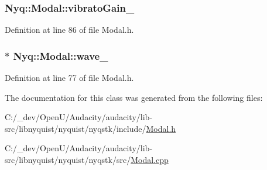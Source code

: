 \subsubsection[{\texorpdfstring{vibrato\+Gain\+\_\+}{vibratoGain_}}]{ Nyq\+::\+Modal\+::vibrato\+Gain\+\_\+\hspace{0.3cm}{\ttfamily [protected]}}\hypertarget{class_nyq_1_1_modal_af45d3067a2cce0a33d90ca5e732b99ab}{}\label{class_nyq_1_1_modal_af45d3067a2cce0a33d90ca5e732b99ab}


Definition at line 86 of file Modal.\+h.

\subsubsection[{\texorpdfstring{wave\+\_\+}{wave_}}]{$\ast$ Nyq\+::\+Modal\+::wave\+\_\+\hspace{0.3cm}{\ttfamily [protected]}}\hypertarget{class_nyq_1_1_modal_af0d1dc63ba1d78d89220f6e4db12b3f2}{}\label{class_nyq_1_1_modal_af0d1dc63ba1d78d89220f6e4db12b3f2}


Definition at line 77 of file Modal.\+h.



The documentation for this class was generated from the following files\+:\begin{DoxyCompactItemize}
\item 
C\+:/\+\_\+dev/\+Open\+U/\+Audacity/audacity/lib-\/src/libnyquist/nyquist/nyqstk/include/\hyperlink{_modal_8h}{Modal.\+h}\item 
C\+:/\+\_\+dev/\+Open\+U/\+Audacity/audacity/lib-\/src/libnyquist/nyquist/nyqstk/src/\hyperlink{_modal_8cpp}{Modal.\+cpp}\end{DoxyCompactItemize}
